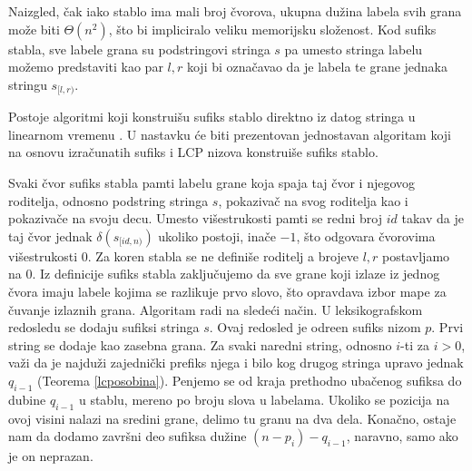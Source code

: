 Naizgled, \v cak iako stablo ima mali broj \v cvorova, ukupna du\v zina labela svih grana mo\v ze biti $\Theta(n^2)$, \v sto bi impliciralo veliku memorijsku slo\v zenost. Kod sufiks stabla, sve labele grana su podstringovi stringa $s$ pa umesto stringa labelu mo\v zemo predstaviti kao par $l,r$ koji bi ozna\v cavao da je labela te grane jednaka stringu $s_{[l, r)}$.

Postoje algoritmi koji konstrui\v su sufiks stablo direktno iz datog stringa u linearnom vremenu \cite{suffixtreerad}. U nastavku \' ce biti prezentovan jednostavan algoritam koji na osnovu izra\v cunatih sufiks i LCP nizova konstrui\v se sufiks stablo.

\noindent
\begin{minipage}[l]{\textwidth}

\end{minipage}

Svaki \v cvor sufiks stabla pamti labelu grane koja spaja taj \v cvor i njegovog roditelja, odnosno podstring stringa $s$, pokaziva\v c na svog roditelja kao i pokaziva\v ce na svoju decu. Umesto vi\v sestrukosti pamti se redni broj $id$ takav da je taj \v cvor jednak $\delta(s_{[id,n)})$ ukoliko postoji, ina\v ce $-1$, \v sto odgovara \v cvorovima vi\v sestrukosti $0$. Za koren stabla se ne defini\v se roditelj a brojeve $l,r$ postavljamo na $0$. Iz definicije sufiks stabla zaklju\v cujemo da sve grane koji izlaze iz jednog \v cvora imaju labele kojima se razlikuje prvo slovo, \v sto opravdava izbor mape za \v cuvanje izlaznih grana. Algoritam radi na slede\' ci na\v cin. U leksikografskom redosledu se dodaju sufiksi stringa $s$. Ovaj redosled je odre\dj en sufiks nizom $p$. Prvi string se dodaje kao zasebna grana. Za svaki naredni string, odnosno $i$-ti za $i>0$, va\v zi da je najdu\v zi zajedni\v cki prefiks njega i bilo kog drugog stringa upravo jednak $q_{i-1}$ (Teorema \ref{lcposobina}). Penjemo se od kraja prethodno uba\v cenog sufiksa do dubine $q_{i-1}$ u stablu, mereno po broju slova u labelama. Ukoliko se pozicija na ovoj visini nalazi na sredini grane, delimo tu granu na dva dela. Kona\v cno, ostaje nam da dodamo zavr\v sni deo sufiksa du\v zine $(n-p_i)-q_{i-1}$, naravno, samo ako je on neprazan.

\noindent
\begin{minipage}[l]{\textwidth}

\end{minipage}

